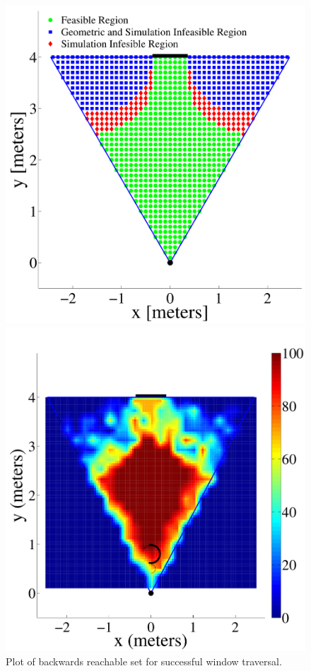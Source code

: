 \documentclass{aamas2013}
\begin{document}
\begin{figure}[tb]
\begin{minipage}[t]{0.45\linewidth}
\includegraphics[width=\textwidth]{figures/feasible_set.pdf}
\caption{Plot of backwards reachable set for successful window traversal.}
\label{fig:feasible_set}
\end{minipage}
\hfill
\begin{minipage}[t]{0.47\linewidth}
\centering
\centering
\includegraphics[width=\textwidth]{figures/heat_map.pdf}

\end{minipage}
\end{figure}
\end{document}
